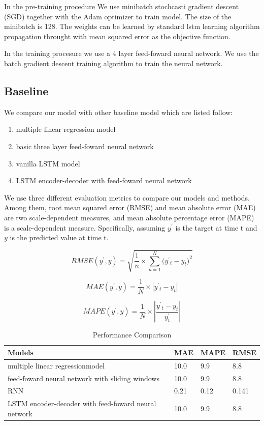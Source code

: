 \documentclass[5p]{elsarticle}
\begin{document}
In the pre-training procedure We use minibatch stochcasti  gradient descent (SGD) together with the Adam optimizer to train model. The size of the minibatch is 128. The weights can be learned by standard lstm learning algorithm propagation throught with mean squared error as the objective function.

In the training procesure we use a 4 layer feed-foward neural network. We use the batch gradient descent training algorithm to train the neural network.

\subsection{Baseline}
We compare our model with other baseline model which are listed follow:
\begin{enumerate}
  \item multiple linear regression model
  \item basic three layer feed-foward neural network
  \item vanilla LSTM model
  \item LSTM encoder-decoder with feed-foward neural network
\end{enumerate}

We use three different evaluation metrics to compare our models and methods. Among them, root mean squared error (RMSE) and mean absolute error (MAE) are two scale-dependent measures, and mean absolute percentage error (MAPE) is a scale-dependent measure. Specifically, assuming $y^'$ is the target at time t and $y$ is the predicted value at time t. 


\begin{equation}
    RMSE(y^{'},y)=\sqrt{\frac{1}{n}\times{\sum_{n=1}^N(y^{'}{_t}-y_t})^2}
\end{equation}

\begin{equation}
	 MAE(y^{'},y)=\frac{1}{N}\times\left| y^{'}{_t}-y_t \right|
\end{equation}

\begin{equation}
	 MAPE(y^{'},y)=\frac{1}{N}\times\left| \frac{y^{'}{_t}-y_t}{y^'_t} \right|
\end{equation}

\begin{table}[]
\centering
\caption{Performance Comparison}
\label{my-label}
\begin{tabular}{|l|l|l|l|}
\hline
Models & MAE & MAPE & RMSE\\
\hline
multiple linear regressionmodel & 10.0 & 9.9  & 8.8 \\
\hline
feed-foward neural network with sliding windows & 10.0 & 9.9  & 8.8 \\
\hline
RNN & 0.21 & 0.12  & 0.141 \\
\hline
LSTM encoder-decoder with feed-foward neural network& 10.0 & 9.9  & 8.8 \\
\hline  
\end{tabular}
\end{table}
\end{document}
